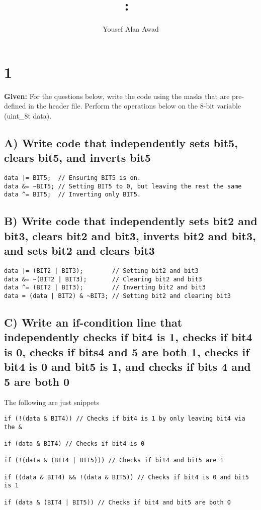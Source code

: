 \documentclass{article}
\title{
    \vspace{2in}
    \textmd{\textbf{\hmwkClass:\ \hmwkTitle}}\\
    \normalsize\vspace{0.1in}
    \vspace{3in}
}
\author{Yousef Alaa Awad}
\begin{document}
\maketitle
\pagebreak

\section{1}
\textbf{Given:} For the questions below, write the code using the masks that are pre-defined in the header file. Perform the operations below on the 8-bit variable (uint\_8t data).

\subsection{A) Write code that independently sets bit5, clears bit5, and inverts bit5}
\begin{lstlisting}
data |= BIT5;  // Ensuring BIT5 is on.
data &= ~BIT5; // Setting BIT5 to 0, but leaving the rest the same
data ^= BIT5;  // Inverting only BIT5.
\end{lstlisting}

\subsection{B) Write code that independently sets bit2 and bit3, clears bit2 and bit3, inverts bit2 and bit3, and sets bit2 and clears bit3}
\begin{lstlisting}
data |= (BIT2 | BIT3);        // Setting bit2 and bit3
data &= ~(BIT2 | BIT3);       // Clearing bit2 and bit3
data ^= (BIT2 | BIT3);        // Inverting bit2 and bit3
data = (data | BIT2) & ~BIT3; // Setting bit2 and clearing bit3
\end{lstlisting}

\subsection{C) Write an if-condition line that independently checks if bit4 is 1, checks if bit4 is 0, checks if bits4 and 5 are both 1, checks if bit4 is 0 and bit5 is 1, and checks if bits 4 and 5 are both 0}
The following are just snippets
\begin{lstlisting}
if (!(data & BIT4)) // Checks if bit4 is 1 by only leaving bit4 via the &

if (data & BIT4) // Checks if bit4 is 0

if (!(data & (BIT4 | BIT5))) // Checks if bit4 and bit5 are 1

if ((data & BIT4) && !(data & BIT5)) // Checks if bit4 is 0 and bit5 is 1

if (data & (BIT4 | BIT5)) // Checks if bit4 and bit5 are both 0
\end{lstlisting}
\end{document}
